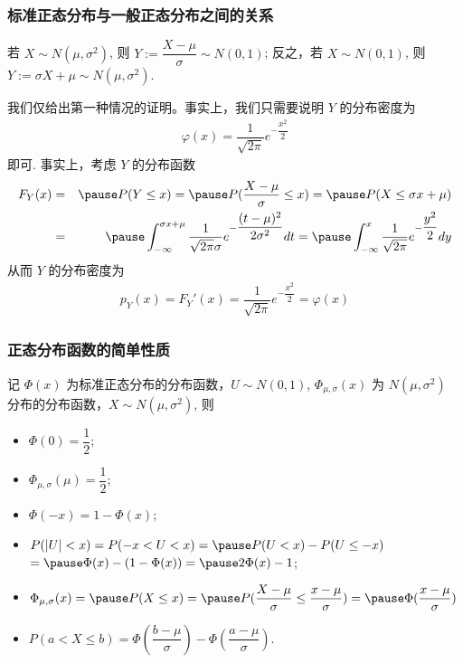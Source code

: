 \documentclass[Prob-All.tex]{subfiles}
\begin{document}
\begin{frame}
	\frametitle{标准正态分布与一般正态分布之间的关系}
	\begin{exam}
		若 $X\sim N (\mu,\sigma^2)$, 则 $Y:=\dfrac{X-\mu}{\sigma}\sim N (0,1)$; 反之，若 $X\sim N (0,1)$, 则 $Y:=\sigma X+\mu\sim N (\mu,\sigma^2)$.
	\end{exam}

	\pause \jieda 我们仅给出第一种情况的证明。事实上，我们只需要说明 $Y$ 的分布密度为
	\vspace{-0.7cm}\begin{eqnarray*}
		\varphi(x)=\dfrac{1}{\sqrt{2\pi}}e^{-\dfrac{x^2}{2}}
	\end{eqnarray*}
	即可. \pause 事实上，考虑 $Y$ 的分布函数
	\begin{eqnarray*}
		F_Y(x)&=&\pause P(Y\le x)=\pause P(\dfrac{X-\mu}{\sigma}\le x)=\pause P(X\le \sigma x+\mu)\\
		&=&\pause \int_{-\infty}^{\sigma x+\mu}\dfrac{1}{\sqrt{2\pi}\sigma}e^{-\dfrac{(t-\mu)^2}{2\sigma^2}}dt=\pause \int_{-\infty}^x\dfrac{1}{\sqrt{2\pi}}e^{-\dfrac{y^2}{2}}dy
	\end{eqnarray*}
	\pause 从而 $Y$ 的分布密度为
	\begin{eqnarray*}
		p_Y(x)=F_Y'(x)=\dfrac{1}{\sqrt{2\pi}}e^{-\dfrac{x^2}{2}}=\varphi(x)
	\end{eqnarray*}
\end{frame}
\begin{frame}
	\frametitle{正态分布函数的简单性质}
	记 $\Phi (x)$ 为标准正态分布的分布函数，$U\sim N (0,1)$,  $\Phi_{\mu,\sigma}(x)$ 为 $N (\mu,\sigma^2)$ 分布的分布函数，$X\sim N (\mu,\sigma^2)$, 则 \pause
	\begin{itemize}[<+-|alert@+>]
		\item $\Phi(0)=\dfrac{1}{2}$;
		\item $\Phi_{\mu,\sigma}(\mu)=\dfrac{1}{2}$;
		\item $\Phi(-x)=1-\Phi(x)$;
		\item $P(|U|<x)=P(-x<U<x)=\pause P(U<x)-P(U\le -x)$ $=\pause \Phi(x)-(1-\Phi(x))=\pause 2\Phi(x)-1$;
		\item $\Phi_{\mu,\sigma}(x)=\pause P(X\le x)=\pause P(\dfrac{X-\mu}{\sigma}\le \dfrac{x-\mu}{\sigma})=\pause \Phi(\dfrac{x-\mu}{\sigma})$\pause
		\item $P(a<X\le b)=\Phi(\dfrac{b-\mu}{\sigma})-\Phi(\dfrac{a-\mu}{\sigma})$.
	\end{itemize}

\end{frame}
\end{document}
